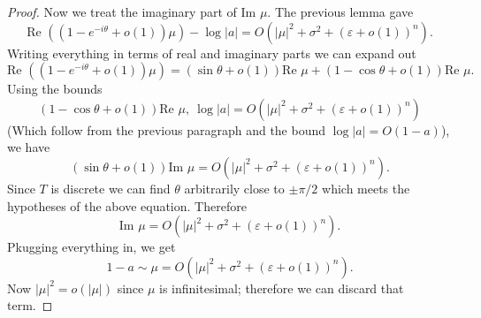 \documentclass[12pt]{article}
\begin{document}
\begin{proof}
Now we treat the imaginary part of $\text{Im } \mu$.
The previous lemma gave
$$\text{Re } ((1 - e^{-i\theta} + o(1))\mu) - \log |a| = O(|\mu|^2 + \sigma^2 + (\varepsilon + o(1))^n).$$
Writing everything in terms of real and imaginary parts we can expand out
$$\text{Re } ((1 - e^{-i\theta} + o(1))\mu) = (\sin \theta + o(1))\text{Re } \mu + (1 - \cos \theta + o(1))\text{Re }\mu.$$
Using the bounds
$$(1 - \cos \theta + o(1))\text{Re }\mu, ~\log |a| = O(|\mu|^2 + \sigma^2 + (\varepsilon + o(1))^n)$$
(Which follow from the previous paragraph and the bound $\log |a| = O(1 - a)$), we have
$$(\sin \theta + o(1))\text{Im } \mu = O(|\mu|^2 + \sigma^2 + (\varepsilon + o(1))^n).$$
Since $T$ is discrete we can find $\theta$ arbitrarily close to $\pm \pi/2$ which meets the hypotheses of the above equation.
Therefore
$$\text{Im } \mu = O(|\mu|^2 + \sigma^2 + (\varepsilon + o(1))^n).$$
Pkugging everything in, we get
$$1 - a \sim \mu = O(|\mu|^2 + \sigma^2 + (\varepsilon + o(1))^n).$$
Now $|\mu|^2 = o(|\mu|)$ since $\mu$ is infinitesimal; therefore we can discard that term.
\end{proof}
\end{document}
